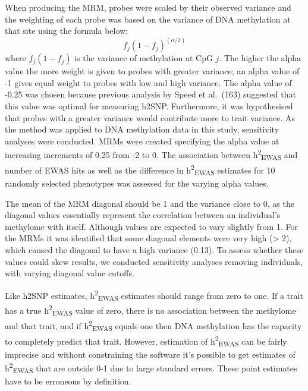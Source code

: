 \documentclass[11pt,oneside]{bristolthesis}
\begin{document}
When producing the MRM, probes were scaled by their observed variance and the weighting of each probe was based on the variance of DNA methylation at that site using the formula below:
\begin{equation}
    f_{j}(1-f_{j})^(\alpha/2)
    \label{eq:mrm-weights}
\end{equation}
where \(f_j(1-f_j)\) is the variance of methylation at CpG \(j\). The higher the alpha value the more weight is given to probes with greater variance; an alpha value of -1 gives equal weight to probes with low and high variance. The alpha value of -0.25 was chosen because previous analysis by Speed et al.~(163) suggested that this value was optimal for measuring h2SNP. Furthermore, it was hypothesised that probes with a greater variance would contribute more to trait variance. As the method was applied to DNA methylation data in this study, sensitivity analyses were conducted. MRMs were created specifying the alpha value at increasing increments of 0.25 from -2 to 0. The association between h\textsuperscript{2}\textsubscript{EWAS} and number of EWAS hits as well as the difference in h\textsuperscript{2}\textsubscript{EWAS} estimates for 10 randomly selected phenotypes was assessed for the varying alpha values.

The mean of the MRM diagonal should be 1 and the variance close to 0, as the diagonal values essentially represent the correlation between an individual's methylome with itself. Although values are expected to vary slightly from 1. For the MRMs it was identified that some diagonal elements were very high (\textgreater{} 2), which caused the diagonal to have a high variance (0.13). To assess whether these values could skew results, we conducted sensitivity analyses removing individuals, with varying diagonal value cutoffs.

Like h2SNP estimates, h\textsuperscript{2}\textsubscript{EWAS} estimates should range from zero to one. If a trait has a true h\textsuperscript{2}\textsubscript{EWAS} value of zero, there is no association between the methylome and that trait, and if h\textsuperscript{2}\textsubscript{EWAS} equals one then DNA methylation has the capacity to completely predict that trait. However, estimation of h\textsuperscript{2}\textsubscript{EWAS} can be fairly imprecise and without constraining the software it's possible to get estimates of h\textsuperscript{2}\textsubscript{EWAS} that are outside 0-1 due to large standard errors. These point estimates have to be erroneous by definition.
\end{document}
